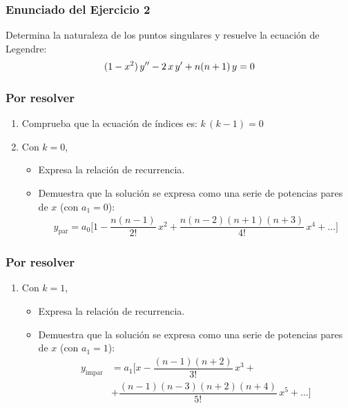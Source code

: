 \documentclass[12pt]{beamer}
\begin{document}
\begin{frame}
\frametitle{Enunciado del Ejercicio 2}
Determina la naturaleza de los puntos singulares y resuelve la ecuación de Legendre:
\begin{align*}
(1 -x^{2}) \, {y}^{\prime \prime} -  2 \, x \, {y}^{\prime} + n(n + 1) \, y = 0
\end{align*}
\end{frame}

\begin{frame}
\frametitle{Por resolver}
\begin{enumerate}[<+->]
\item Comprueba que la ecuación de índices es: $k \, (k - 1) = 0$
\item Con $k = 0$, 
\begin{itemize}
\item Expresa la relación de recurrencia.
\item Demuestra que la solución se expresa como una serie de potencias pares de $x$ (con $a_{1} = 0$):
\begin{align*}
    y_{\mbox{par}} = a_{0} \bigg[ 1 - \dfrac{n (n - 1)}{2!} \, x^{2} + \dfrac{n (n - 2)(n + 1)(n + 3)}{4!} \, x^{4} + \ldots \bigg]
\end{align*}
\end{itemize}
\seti
\end{enumerate}
\end{frame}

\begin{frame}
\frametitle{Por resolver}
\begin{enumerate}[<+->]
\conti
\item Con $k = 1$, 
\begin{itemize}
\item Expresa la relación de recurrencia.
\item Demuestra que la solución se expresa como una serie de potencias pares de $x$ (con $a_{1} = 1$):
\begin{align*}
y_{\mbox{impar}} &= a_{1} \bigg[ x - \dfrac{(n - 1)(n + 2)}{3!} \, x^{3} + \\[0.5em] 
&+ \dfrac{(n - 1)(n - 3)(n + 2)(n + 4)}{5!} \, x^{5} + \ldots \bigg]
\end{align*}
\end{itemize}
\end{enumerate}
\end{frame}
\end{document}
